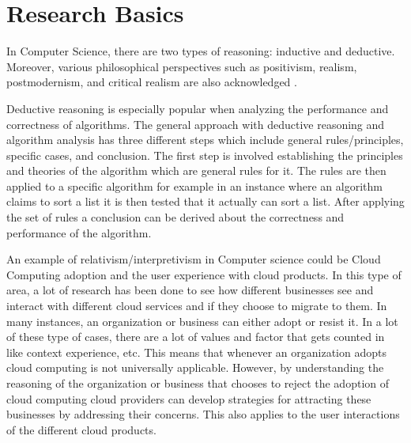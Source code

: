 \documentclass{article}
\begin{document}
\section{Research Basics}
In Computer Science, there are two types of reasoning: inductive and deductive. Moreover, various philosophical perspectives such as positivism, realism, postmodernism, and critical realism are also acknowledged \cite{Walliman_2022}.

Deductive reasoning is especially popular when analyzing the performance and correctness of algorithms. The general approach with deductive reasoning and algorithm analysis has three different steps which include general rules/principles, specific cases, and conclusion. The first step is involved establishing the principles and theories of the algorithm which are general rules for it. The rules are then applied to a specific algorithm for example in an instance where an algorithm claims to sort a list it is then tested that it actually can sort a list. After applying the set of rules a conclusion can be derived about the correctness and performance of the algorithm.

An example of relativism/interpretivism in Computer science could be Cloud Computing adoption and the user experience with cloud products. In this type of area, a lot of research has been done to see how different businesses see and interact with different cloud services and if they choose to migrate to them. In many instances, an organization or business can either adopt or resist it. In a lot of these type of cases, there are a lot of values and factor that gets counted in like context experience, etc. This means that whenever an organization adopts cloud computing is not universally applicable. However, by understanding the reasoning of the organization or business that chooses to reject the adoption of cloud computing cloud providers can develop strategies for attracting these businesses by addressing their concerns. This also applies to the user interactions of the different cloud products.





\end{document}
